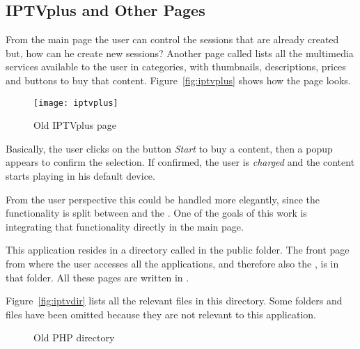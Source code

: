 \subsection{IPTVplus and Other Pages} %
\label{sub:iptvplus}

From the main  page the user can control the sessions that are already created but, how can he create new sessions?
Another page called  lists all the multimedia services available to the user in categories, with thumbnails, descriptions, prices and buttons to buy that content.
Figure~\vref{fig:iptvplus} shows how the page looks.

\begin{figure}[htbp]
  \centering
    \texttt{[image: iptvplus]}
  \caption{Old IPTVplus page}
  \label{fig:iptvplus}
\end{figure}

Basically, the user clicks on the button \textit{Start} to buy a content, then a popup appears to confirm the selection.
If confirmed, the user is \textit{charged} and the content starts playing in his default device.

From the user perspective this could be handled more elegantly, since the functionality is split between  and the .
One of the goals of this work is integrating that functionality directly in the main  page.

This  application resides in a directory called  in the  public folder.
The front page from where the user accesses all the  applications, and therefore also the , is in that folder.
All these pages are written in .

Figure~\vref{fig:iptvdir} lists all the relevant  files in this directory.
Some folders and files have been omitted because they are not relevant to this application.

\begin{figure}[htbp]
  \caption{Old PHP directory}
  \label{fig:iptvdir}
\end{figure}

